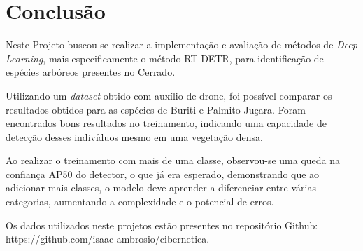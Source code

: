 \section{Conclusão}

Neste Projeto buscou-se realizar a implementação e avaliação de métodos de\textit{ Deep Learning}, mais especificamente o método RT-DETR, para identificação de espécies arbóreos presentes no Cerrado.

Utilizando um \textit{dataset} obtido com auxílio de drone, foi possível comparar os resultados obtidos para as espécies de Buriti e Palmito Juçara. Foram encontrados bons resultados no treinamento, indicando uma capacidade de detecção desses indivíduos mesmo em uma vegetação densa.

Ao realizar o treinamento com mais de uma classe, observou-se uma queda na confiança AP50 do detector, o que já era esperado, demonstrando que ao adicionar mais classes, o modelo deve aprender a diferenciar entre várias categorias, aumentando a complexidade e o potencial de erros.

Os dados utilizados neste projetos estão presentes no repositório Github: https://github.com/isaac-ambrosio/cibernetica.
